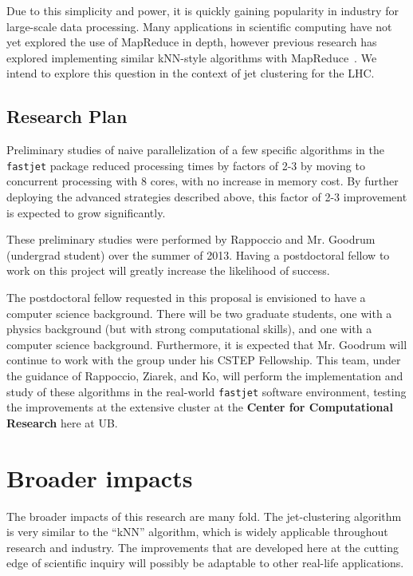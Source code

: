 \documentclass[times,11pt]{article}
\begin{document}
Due to this simplicity and power, it is quickly gaining popularity in industry
for large-scale data processing. Many applications in scientific computing have not
yet explored the use of MapReduce in depth, however
previous research has explored implementing similar kNN-style
algorithms with
MapReduce~\cite{knn-mapreduce-0, knn-mapreduce-1}. We intend to explore this
question in the context of jet clustering for the LHC.



\subsection{Research Plan}

Preliminary studies of naive parallelization of a few specific
algorithms in the {\tt fastjet} package reduced processing times by
factors of 2-3 by moving to concurrent processing with 8 cores, with
no increase in memory cost. By further deploying the advanced
strategies described above, this factor of 2-3 improvement is expected
to grow significantly. 

These preliminary studies were performed by Rappoccio and Mr.
Goodrum (undergrad student) over the summer of 2013. Having a
postdoctoral fellow to work on this project will greatly increase the
likelihood of success. 

The postdoctoral fellow requested in this proposal is envisioned to
have a computer science background. There will be two graduate
students, one with a physics background (but with strong computational
skills), and one with a computer science background. Furthermore, it
is expected that Mr. Goodrum will continue to work with the group
under his CSTEP Fellowship. This team, under
the guidance of Rappoccio, Ziarek, and Ko, will perform the
implementation and study of these algorithms in the real-world 
{\tt fastjet} software environment, testing the improvements at the
extensive cluster at the {\bf Center for Computational Research} here
at UB. 

\section{Broader impacts}

The broader impacts of this research are many fold. The jet-clustering
algorithm is very similar to the ``kNN'' algorithm, which is widely
applicable throughout research and industry. The improvements that are
developed here at the cutting edge of scientific inquiry will possibly be
adaptable to other real-life applications. 
\end{document}
